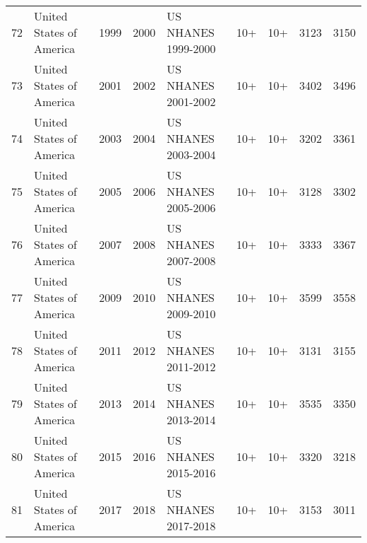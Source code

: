 \begin{longtable}[t]{rlrrlllrr}
72 & United States of America & 1999 & 2000 & US NHANES 1999-2000 & 10+ & 10+ & 3123 & 3150\\
73 & United States of America & 2001 & 2002 & US NHANES 2001-2002 & 10+ & 10+ & 3402 & 3496\\
74 & United States of America & 2003 & 2004 & US NHANES 2003-2004 & 10+ & 10+ & 3202 & 3361\\
75 & United States of America & 2005 & 2006 & US NHANES 2005-2006 & 10+ & 10+ & 3128 & 3302\\
76 & United States of America & 2007 & 2008 & US NHANES 2007-2008 & 10+ & 10+ & 3333 & 3367\\
77 & United States of America & 2009 & 2010 & US NHANES 2009-2010 & 10+ & 10+ & 3599 & 3558\\
78 & United States of America & 2011 & 2012 & US NHANES 2011-2012 & 10+ & 10+ & 3131 & 3155\\
79 & United States of America & 2013 & 2014 & US NHANES 2013-2014 & 10+ & 10+ & 3535 & 3350\\
80 & United States of America & 2015 & 2016 & US NHANES 2015-2016 & 10+ & 10+ & 3320 & 3218\\
81 & United States of America & 2017 & 2018 & US NHANES 2017-2018 & 10+ & 10+ & 3153 & 3011\\*
\end{longtable}
\endgroup{}
